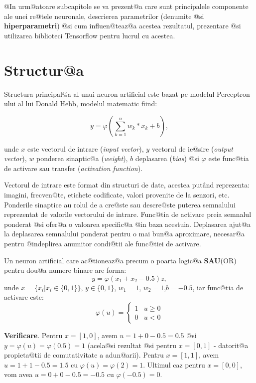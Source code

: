 @In urm@atoare subcapitole se va prezent@a care sunt principalele componente ale unei re@tele neuronale, descrierea parametrilor (denumite @si \textbf{hiperparametri}) @si cum influen@teaz@a acestea rezultatul, prezentare @si utilizarea biblioteci Tensorflow pentru lucrul cu acestea.

\section{Structur@a}

Structura principal@a al unui neuron artificial este bazat pe modelul Perceptron-ului al lui Donald Hebb, modelul matematic fiind:

$$
	y = \varphi \left( \sum_{k=1}^{n} w_k * x_k + b \right),
$$


\indent unde $x$ este vectorul de intrare ({\sl input vector}), $y$ vectorul de ie@sire ({\sl output vector}), $w$ ponderea sinaptic@a ({\sl weight}), $b$ deplasarea ({\sl bias}) @si $\varphi$ este func@tia de activare sau transfer ({\sl activation function}).

Vectorul de intrare este format din structuri de date, acestea put\^ and reprezenta: imagini, frecven@te, etichete codificate, valori provenite de la senzori, etc. Ponderile sinaptice au rolul de a cre@ste sau descre@ste puterea semnalului reprezentat de valorile vectorului de intrare. Func@tia de activare preia semnalul ponderat @si ofer@a o valoarea specific@a @in baza acestuia. Deplasarea ajut@a la deplasarea semnalului ponderat pentru o mai bun@a aproximare, necesar@a pentru @indeplirea anumitor condi@tii ale func@tiei de activare.

\begin{exemplu}

	Un neuron artificial care ac@tioneaz@a precum o poarta logic@a {\bf SAU}(OR) pentru dou@a numere binare are forma:
$$
	y = \varphi ( x_1 + x_2 - 0.5 )z,
$$
\noindent unde $x = \{ x_i | x_i \in \{0, 1\} \}$, $y \in \{0, 1\}$, $w_1 = 1$, $w_2 = 1$,$b = -0.5$, iar func@tia de activare este: 
$$
	\varphi ( u ) = \left\lbrace
		\begin{array}{lc}
			1 & u \geq 0 \\
			0 & u < 0
		\end{array}
	\right.
$$
\end{exemplu}

{\bf Verificare}. Pentru $x = [1, 0]$, avem $u = 1 + 0 - 0.5 = 0.5$ @si $y = \varphi(u) = \varphi(0.5) = 1$ (acela@si rezultat @si pentru $x = [0, 1]$ - datorit@a propieta@tii de comutativitate a adun@arii).
Pentru $x = [1, 1]$, avem $u = 1 + 1 - 0.5 = 1.5$ cu $\varphi (u) = \varphi ( 2 ) = 1$. Ultimul caz pentru $x = [0, 0]$, vom avea $u = 0 + 0 - 0.5 = -0.5$ cu $\varphi (-0.5) = 0$.

